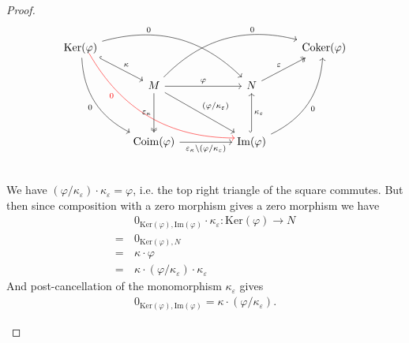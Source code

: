 \begin{proof}
\[
\begin{tikzcd}
\mathrm{Ker}(\varphi) \arrow[rd, "\kappa", hook] \arrow[rddd, "0"', bend right] \arrow[rrrd, "0", pos=0.3, bend left] \arrow[rrrddd, "0"', pos=0.25, color=red, shift left=2, bend right] &                                                                                                                                                    &  &                                                                                               & \mathrm{Coker}(\varphi) \\
                                                                                                                                             & M \arrow[rrru, "0", pos=0.7, bend left] \arrow[rr, "\varphi"] \arrow[dd, "\varepsilon_{\kappa}"', two heads] \arrow[rrdd, "(\varphi/\kappa_{\varepsilon})"] &  & N \arrow[ru, "\varepsilon", two heads]                                                        &                         \\
                                                                                                                                             &                                                                                                                                                    &  &                                                                                               &                         \\
                                                                                                                                             & \mathrm{Coim}(\varphi) \arrow[rr, "\varepsilon_{\kappa}\backslash(\varphi/\kappa_{\varepsilon})"']                                                 &  & \mathrm{Im}(\varphi) \arrow[uu, "\kappa_{\varepsilon}"', hook] \arrow[ruuu, "0"', bend right] &                        
\end{tikzcd}
\]

\begin{subproof}[Proof that $\kappa \cdot (\varphi / \kappa_{\varepsilon}) = 0_{\mathrm{Ker}(\varphi),\mathrm{Im}(\varphi)}$]\phantom{}\\
We have $(\varphi / \kappa_{\varepsilon}) \cdot \kappa_{\varepsilon} = \varphi$, i.e. the top right triangle
of the square commutes. But then since composition with a zero morphism gives a zero morphism we have
\begin{align*}
&0_{\mathrm{Ker}(\varphi),\mathrm{Im}(\varphi)} \cdot \kappa_{\varepsilon} : \mathrm{Ker}(\varphi) \rightarrow N \\
=\, &0_{\mathrm{Ker}(\varphi),N} \\
=\, &\kappa \cdot \varphi \\
=\, &\kappa \cdot (\varphi / \kappa_{\varepsilon}) \cdot \kappa_{\varepsilon}
\end{align*}
And post-cancellation of the monomorphism $\kappa_{\varepsilon}$ gives
\begin{align*}
0_{\mathrm{Ker}(\varphi),\mathrm{Im}(\varphi)} = \kappa \cdot (\varphi / \kappa_{\varepsilon}).
\end{align*}
\end{subproof}


\end{proof}

